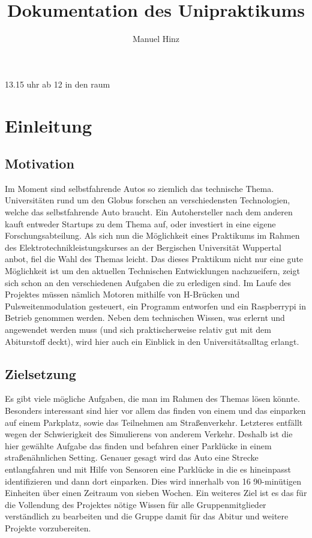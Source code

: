 \documentclass{report}
\author{Manuel Hinz}
\title{Dokumentation des Unipraktikums}
\begin{document}
\maketitle

13.15 uhr ab 12 in den raum

\tableofcontents
\newpage

\chapter{Einleitung}

\section{Motivation}
Im Moment sind selbstfahrende Autos so ziemlich das technische Thema. Universitäten rund um den Globus forschen an verschiedensten Technologien, welche das selbstfahrende Auto braucht. Ein Autohersteller nach dem anderen kauft entweder Startups zu dem Thema auf, oder investiert in eine eigene Forschungsabteilung. Als sich nun die Möglichkeit eines Praktikums im Rahmen des Elektrotechnikleistungskurses an der Bergischen Universität Wuppertal anbot, fiel die Wahl des Themas leicht. Das dieses Praktikum nicht nur eine gute Möglichkeit ist um den aktuellen Technischen Entwicklungen nachzueifern, zeigt sich schon an den verschiedenen Aufgaben die zu erledigen sind. Im Laufe des Projektes müssen nämlich Motoren mithilfe von H-Brücken und Pulsweitenmodulation gesteuert, ein Programm entworfen und ein Raspberrypi in Betrieb genommen werden. Neben dem technischen Wissen, was erlernt und angewendet werden muss (und sich praktischerweise relativ gut mit dem Abiturstoff deckt), wird hier auch ein Einblick in den Universitätsalltag erlangt.  
\section{Zielsetzung}
Es gibt viele mögliche Aufgaben, die man im Rahmen des Themas lösen könnte. Besonders interessant sind hier vor allem das finden von einem und das einparken auf einem Parkplatz, sowie das Teilnehmen am Straßenverkehr. Letzteres entfällt wegen der Schwierigkeit des Simulierens von anderem Verkehr. Deshalb ist die hier gewählte Aufgabe das finden und befahren einer Parklücke in einem straßenähnlichen Setting. Genauer gesagt wird das Auto eine Strecke entlangfahren und mit Hilfe von Sensoren eine Parklücke in die es hineinpasst identifizieren und dann dort einparken. Dies wird innerhalb von 16 90-minütigen Einheiten über einen Zeitraum von sieben Wochen. Ein weiteres Ziel ist es das für die Vollendung des Projektes nötige Wissen für alle Gruppenmitglieder verständlich zu bearbeiten und die Gruppe damit für das Abitur und weitere Projekte vorzubereiten.
\end{document}
